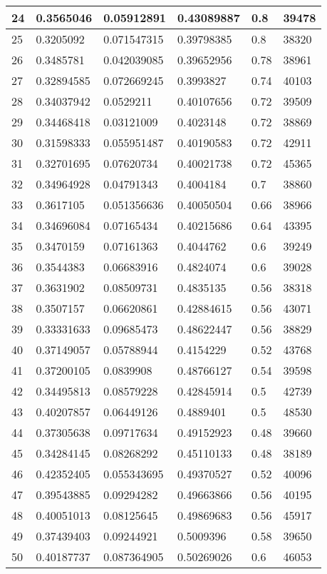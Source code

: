 \begin{longtable}{|l|l|l|l|l|l|}
24 & 0.3565046 & 0.05912891 & 0.43089887 & 0.8 & 39478 \\ \hline 
25 & 0.3205092 & 0.071547315 & 0.39798385 & 0.8 & 38320 \\ \hline 
26 & 0.3485781 & 0.042039085 & 0.39652956 & 0.78 & 38961 \\ \hline 
27 & 0.32894585 & 0.072669245 & 0.3993827 & 0.74 & 40103 \\ \hline 
28 & 0.34037942 & 0.0529211 & 0.40107656 & 0.72 & 39509 \\ \hline 
29 & 0.34468418 & 0.03121009 & 0.4023148 & 0.72 & 38869 \\ \hline 
30 & 0.31598333 & 0.055951487 & 0.40190583 & 0.72 & 42911 \\ \hline 
31 & 0.32701695 & 0.07620734 & 0.40021738 & 0.72 & 45365 \\ \hline 
32 & 0.34964928 & 0.04791343 & 0.4004184 & 0.7 & 38860 \\ \hline 
33 & 0.3617105 & 0.051356636 & 0.40050504 & 0.66 & 38966 \\ \hline 
34 & 0.34696084 & 0.07165434 & 0.40215686 & 0.64 & 43395 \\ \hline 
35 & 0.3470159 & 0.07161363 & 0.4044762 & 0.6 & 39249 \\ \hline 
36 & 0.3544383 & 0.06683916 & 0.4824074 & 0.6 & 39028 \\ \hline 
37 & 0.3631902 & 0.08509731 & 0.4835135 & 0.56 & 38318 \\ \hline 
38 & 0.3507157 & 0.06620861 & 0.42884615 & 0.56 & 43071 \\ \hline 
39 & 0.33331633 & 0.09685473 & 0.48622447 & 0.56 & 38829 \\ \hline 
40 & 0.37149057 & 0.05788944 & 0.4154229 & 0.52 & 43768 \\ \hline 
41 & 0.37200105 & 0.0839908 & 0.48766127 & 0.54 & 39598 \\ \hline 
42 & 0.34495813 & 0.08579228 & 0.42845914 & 0.5 & 42739 \\ \hline 
43 & 0.40207857 & 0.06449126 & 0.4889401 & 0.5 & 48530 \\ \hline 
44 & 0.37305638 & 0.09717634 & 0.49152923 & 0.48 & 39660 \\ \hline 
45 & 0.34284145 & 0.08268292 & 0.45110133 & 0.48 & 38189 \\ \hline 
46 & 0.42352405 & 0.055343695 & 0.49370527 & 0.52 & 40096 \\ \hline 
47 & 0.39543885 & 0.09294282 & 0.49663866 & 0.56 & 40195 \\ \hline 
48 & 0.40051013 & 0.08125645 & 0.49869683 & 0.56 & 45917 \\ \hline 
49 & 0.37439403 & 0.09244921 & 0.5009396 & 0.58 & 39650 \\ \hline 
50 & 0.40187737 & 0.087364905 & 0.50269026 & 0.6 & 46053 \\ \hline 
\end{longtable}